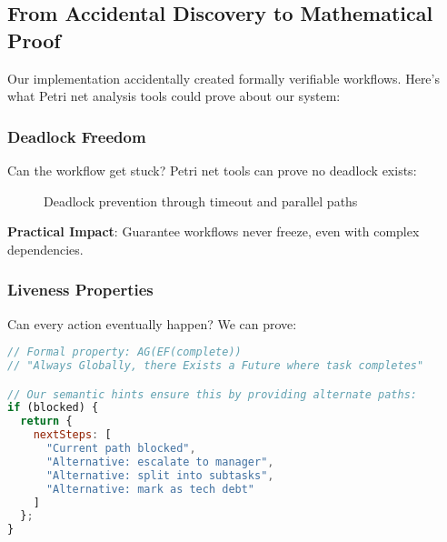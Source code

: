 \documentclass[11pt,a4paper]{article}
\begin{document}
\subsection{From Accidental Discovery to Mathematical Proof}

Our implementation accidentally created formally verifiable workflows. Here's what Petri net analysis tools could prove about our system:

\subsubsection{Deadlock Freedom}

Can the workflow get stuck? Petri net tools can prove no deadlock exists:

\begin{figure}[H]
\centering
{}
\caption{Deadlock prevention through timeout and parallel paths}
\end{figure}

\textbf{Practical Impact}: Guarantee workflows never freeze, even with complex dependencies.

\subsubsection{Liveness Properties}

Can every action eventually happen? We can prove:

\begin{lstlisting}[language=JavaScript]
// Formal property: AG(EF(complete))
// "Always Globally, there Exists a Future where task completes"

// Our semantic hints ensure this by providing alternate paths:
if (blocked) {
  return {
    nextSteps: [
      "Current path blocked",
      "Alternative: escalate to manager",
      "Alternative: split into subtasks",
      "Alternative: mark as tech debt"
    ]
  };
}
\end{lstlisting}
\end{document}

